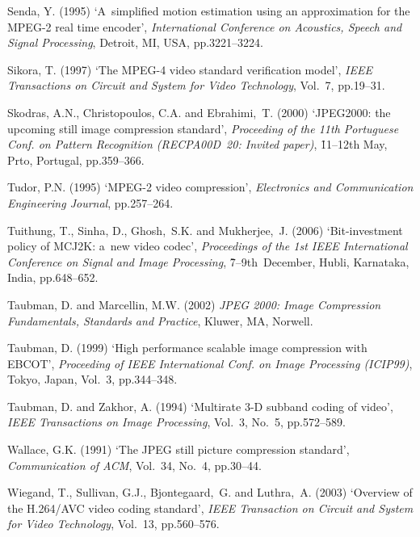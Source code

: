 \documentclass{doublecol-new}
\theoremstyle{TH}{
\newtheorem{lemma}{Lemma}[section]
\newtheorem{theorem}{Theorem}
\newtheorem{corrolary}{Corrolary}
\newtheorem{conjecture}[lemma]{Conjecture}
\newtheorem{proposition}[lemma]{Proposition}
\newtheorem{claim}[lemma]{Claim}
\newtheorem{stheorem}[lemma]{Wrong Theorem}
}
\theoremstyle{THrm}{
\newtheorem{definition}{Definition}[section]
\newtheorem{question}{Question}[section]
\newtheorem{remark}{Remark}[section]
\newtheorem{scheme}{Scheme}
}
\theoremstyle{THhit}{
\newtheorem{case}{Case}[section]
}
\begin{document}
\begin{thebibliography}{10}
Senda, Y. (1995) `A~simplified motion estimation using an approximation for the
MPEG-2 real time encoder', {\it International Conference on Acoustics, Speech
and Signal Processing}, Detroit, MI, USA, pp.3221--3224. %

Sikora, T. (1997) `The MPEG-4 video standard verification model', {\it IEEE
Transactions on Circuit and System for Video Technology}, Vol.~7, pp.19--31.

Skodras, A.N., Christopoulos, C.A. and Ebrahimi,~T. (2000) `JPEG2000:
the upcoming still image compression standard', {\it Proceeding of
the 11th Portuguese Conf. on Pattern Recognition (RECPA00D~20:
Invited paper)}, \h{11--12th} May, Prto, Portugal,  pp.359--366.

Tudor, P.N. (1995) `MPEG-2 video compression', {\it Electronics and
Communication Engineering Journal}, pp.257--264.

Tuithung, T., Sinha, D., Ghosh,~S.K. and Mukherjee,~J. (2006)
`Bit-investment policy of MCJ2K: a~new video codec', {\it Proceedings
of the 1st IEEE International Conference on Signal and Image
Processing}, \h{7--9th}~December, Hubli, Karnataka, India,
pp.648--652.

Taubman, D. and Marcellin, M.W. (2002) {\it JPEG 2000: Image Compression
Fundamentals, Standards and Practice}, Kluwer, MA, Norwell.

Taubman, D. (1999) `High performance scalable image compression with EBCOT',
{\it Proceeding of IEEE International Conf. on Image Processing (ICIP99)},
Tokyo, Japan, Vol.~3, pp.344--348.

Taubman, D. and Zakhor, A. (1994) `Multirate 3-D subband coding of video', {\it
IEEE Transactions on Image Processing}, Vol.~3, No.~5, pp.572--589.

Wallace, G.K. (1991) `The JPEG still picture compression standard', {\it
Communication of ACM}, Vol.~34, No.~4, pp.30--44.

Wiegand, T., Sullivan, G.J., Bjontegaard,~G. and Luthra,~A. (2003) `Overview of
the H.264/AVC video coding standard', {\it IEEE Transaction on Circuit and
System for Video Technology}, Vol.~13, pp.560--576.


\end{thebibliography}
\end{document}
